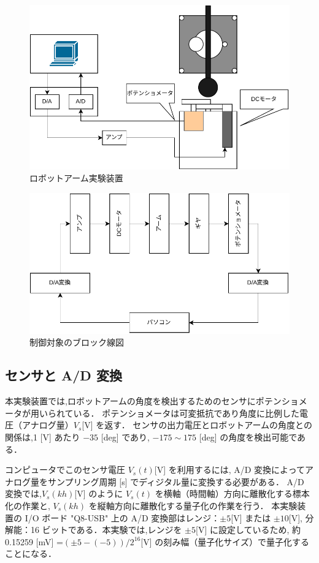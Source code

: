 \begin{figure}[h]
  \centering
  \includegraphics[scale=0.4]{sozai/1.pdf}
  \caption{ロボットアーム実験装置}
\end{figure}

\begin{figure}[h]
  \centering
  \includegraphics[scale=0.65]{sozai/2.pdf}
  \caption{制御対象のブロック線図}
\end{figure}

\subsection{センサと A/D 変換}

本実験装置では,ロボットアームの角度を検出するためのセンサにポテンショメータが用いられている．
ポテンショメータは可変抵抗であり角度に比例した電圧（アナログ量）\(V_s\)[V] を返す．
センサの出力電圧とロボットアームの角度との関係は,1 [V] あたり \(-35\) [deg] であり,
\(-175 \sim 175\) [deg] の角度を検出可能である．

コンピュータでこのセンサ電圧 \(V_s(t) \)[V] を利用するには,
A/D 変換によってアナログ量をサンプリング周期 [s] でディジタル量に変換する必要がある．
A/D 変換では,\(V_s(kh) \)[V] のように \(V_s(t)\) を横軸（時間軸）方向に離散化する標本化の作業と,
\(V_s(kh)\) を縦軸方向に離散化する量子化の作業を行う．
本実験装置の I/O ボード "Q8-USB" 上の A/D 変換部はレンジ：\(\pm 5 \)[V] または \(\pm 10 \)[V],
分解能：16 ビットである．本実験では,レンジを \(\pm 5 \)[V] に設定しているため,
約 0.15259 [mV] =\( (\pm 5 - (-5))/2^{16} \)[V] の刻み幅（量子化サイズ）で量子化することになる．

